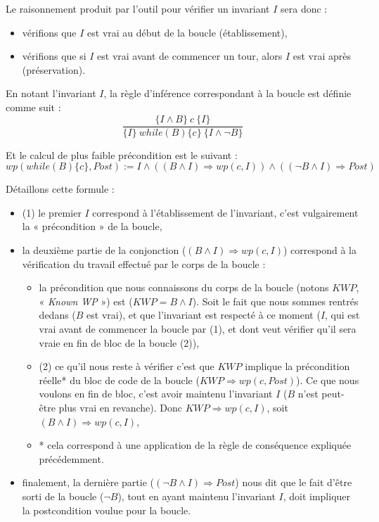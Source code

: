 Le raisonnement produit par l'outil pour vérifier un invariant $I$ sera donc :



\begin{itemize}
\item vérifions que $I$ est vrai au début de la boucle (établissement),
\item vérifions que si $I$ est vrai avant de commencer un tour, alors $I$ est vrai après (préservation).
\end{itemize}




En notant l'invariant $I$, la règle d'inférence correspondant à la boucle est 
définie comme suit :
$$\dfrac{\{I \wedge B \}\ c\ \{I\}}{\{I\}\ while(B)\{c\}\ \{I \wedge \neg B\}}$$


Et le calcul de plus faible précondition est le suivant :
$$wp(while (B) \{ c \}, Post) := I \wedge ((B \wedge I) \Rightarrow wp(c, I)) \wedge ((\neg B \wedge I) \Rightarrow Post)$$


Détaillons cette formule :



\begin{itemize}
\item (1) le premier $I$ correspond à l'établissement de l'invariant, c'est 
vulgairement la « précondition » de la boucle,
\item la deuxième partie de la conjonction ($(B \wedge I) \Rightarrow wp(c, I)$)
correspond à la vérification du travail effectué par le corps de la boucle :

\begin{itemize}
\item la précondition que nous connaissons du corps de la boucle (notons $KWP$,
« \textit{Known WP} ») est ($KWP = B \wedge I$). Soit le fait que nous sommes
rentrés dedans ($B$ est vrai), et que l'invariant est respecté à ce moment
($I$, qui est vrai avant de commencer la boucle par (1), et dont veut 
vérifier qu'il sera vraie en fin de bloc de la boucle (2)),
\item (2) ce qu'il nous reste à vérifier c'est que $KWP$ implique la 
précondition réelle* du bloc de code de la boucle 
  ($KWP \Rightarrow wp(c, Post)$). Ce que nous voulons en fin de bloc, 
  c'est avoir maintenu l'invariant $I$ ($B$ n'est peut-être plus vrai en
  revanche). Donc 
$KWP \Rightarrow wp(c, I)$, soit $(B \wedge I) \Rightarrow wp(c, I)$,
\item * cela correspond à une application de la règle de conséquence expliquée
précédemment.
\end{itemize}
\item finalement, la dernière partie ($(\neg B \wedge I) \Rightarrow Post$)
nous dit que le fait d'être sorti de la boucle ($\neg B$), tout en ayant 
maintenu l'invariant $I$, doit impliquer la postcondition voulue pour la 
boucle.
\end{itemize}


